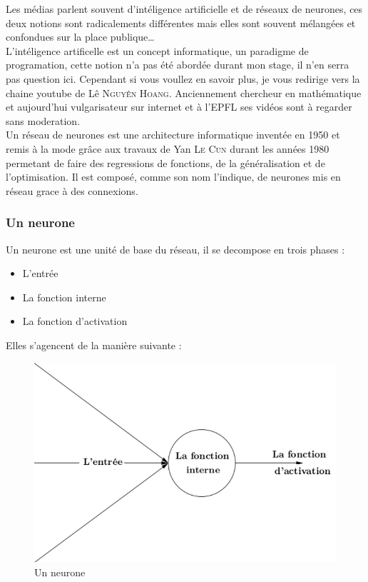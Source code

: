 
Les médias parlent souvent d'intéligence artificielle et de réseaux de neurones,
ces deux notions sont radicalements différentes
mais elles sont souvent mélangées et confondues sur la place publique\ldots \\

L'intéligence artificelle est un concept informatique, un paradigme de programation,
cette notion n'a pas été abordée durant mon stage, il n'en serra pas question ici.
Cependant si vous voullez en savoir plus, je vous redirige vers la chaine youtube de Lê \textsc{Nguyên Hoang}.
Anciennement chercheur en mathématique et aujourd'hui vulgarisateur sur internet et à l'\textsc{EPFL}
ses vidéos sont à regarder sans moderation\cite{science4all}. \\

Un réseau de neurones est une architecture informatique inventée en 1950 et remis à la mode grâce aux travaux
de Yan \textsc{Le Cun} durant les années 1980 permetant de faire des regressions de fonctions,
de la généralisation et de l'optimisation.
Il est composé, comme son nom l'indique, de neurones mis en réseau grace à des connexions.


\subsubsection{Un neurone}
Un neurone est une unité de base du réseau, il se decompose en trois phases :
\begin{itemize}
    \item L'entrée
    \item La fonction interne
    \item La fonction d'activation
\end{itemize}
Elles s'agencent de la manière suivante :
\begin{figure}[H]
    \center
    \includegraphics[height=\petit]{pict/neurone.png}
	\caption{Un neurone}
    \label{fig:neurone}
\end{figure}


